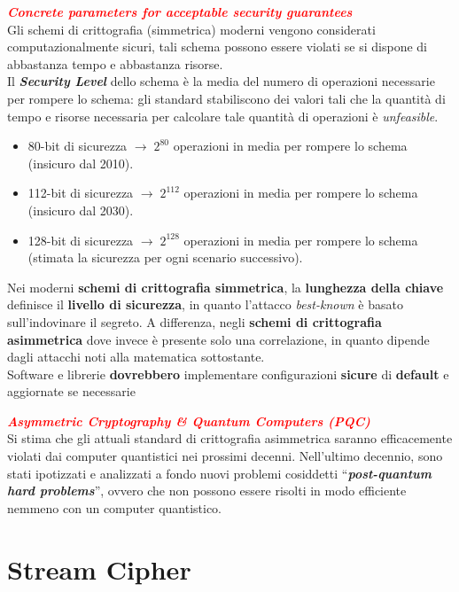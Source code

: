 \begin{flushleft}
    \textcolor{red}{\textbf{\textit{Concrete parameters for acceptable security guarantees}}} \\
    Gli schemi di crittografia (simmetrica) moderni vengono considerati computazionalmente sicuri, tali schema possono essere violati se si dispone di abbastanza tempo e abbastanza risorse. \\
    Il \textbf{\textit{Security Level}} dello schema è la media del numero di operazioni necessarie per rompere lo schema: gli standard stabiliscono dei valori tali che la quantità di tempo e risorse necessaria per calcolare tale quantità di operazioni è \textit{unfeasible}.
    \begin{itemize}[nosep]
        \item 80-bit di sicurezza $\rightarrow \; 2^{80}$ operazioni in media per rompere lo schema (insicuro dal 2010).
        \item 112-bit di sicurezza $\rightarrow \; 2^{112}$ operazioni in media per rompere lo schema (insicuro dal 2030).
        \item 128-bit di sicurezza $\rightarrow \; 2^{128}$ operazioni in media per rompere lo schema (stimata la sicurezza per ogni scenario successivo).
    \end{itemize}

    Nei moderni \textbf{schemi di crittografia simmetrica}, la \textbf{lunghezza della chiave} definisce il \textbf{livello di sicurezza}, in quanto l'attacco \textit{best-known} è basato sull'indovinare il segreto. A differenza, negli \textbf{schemi di crittografia asimmetrica} dove invece è presente solo una correlazione, in quanto dipende dagli attacchi noti alla matematica sottostante. \\

    Software e librerie \textbf{dovrebbero} implementare configurazioni \textbf{sicure} di \textbf{default} e aggiornate se necessarie
\end{flushleft}

\begin{flushleft}
    \textcolor{red}{\textbf{\textit{Asymmetric Cryptography \& Quantum Computers (PQC)}}} \\
    Si stima che gli attuali standard di crittografia asimmetrica saranno efficacemente violati dai computer quantistici nei prossimi decenni. Nell'ultimo decennio, sono stati ipotizzati e analizzati a fondo nuovi problemi cosiddetti ``\textbf{\textit{post-quantum hard problems}}'', ovvero che non possono essere risolti in modo efficiente nemmeno con un computer quantistico.
\end{flushleft}

\section{Stream Cipher}